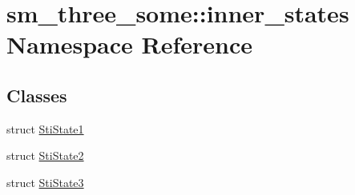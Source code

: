 \hypertarget{namespacesm__three__some_1_1inner__states}{}\section{sm\+\_\+three\+\_\+some\+:\+:inner\+\_\+states Namespace Reference}
\label{namespacesm__three__some_1_1inner__states}
\subsection*{Classes}
\begin{DoxyCompactItemize}
\item 
struct \hyperlink{structsm__three__some_1_1inner__states_1_1StiState1}{Sti\+State1}
\item 
struct \hyperlink{structsm__three__some_1_1inner__states_1_1StiState2}{Sti\+State2}
\item 
struct \hyperlink{structsm__three__some_1_1inner__states_1_1StiState3}{Sti\+State3}
\end{DoxyCompactItemize}
